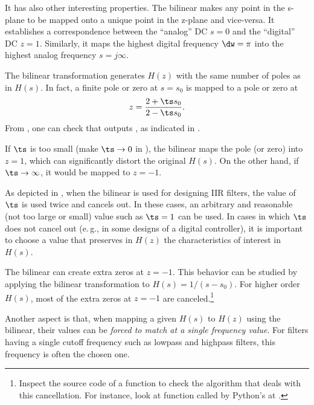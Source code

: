 It has also other interesting properties.
The bilinear makes any point in the s-plane to be mapped onto a unique point in the z-plane and vice-versa. It establishes a correspondence between the ``analog'' DC $s=0$ and the ``digital'' DC $z=1$. Similarly, it maps the highest digital frequency $\dw=\pi$ into the highest analog frequency $s=j\infty$.

The bilinear transformation generates $H(z)$ with the same number of poles as in $H(s)$. 
In fact, a finite pole or zero at $s=s_0$ is mapped to a pole or zero at 
\begin{equation}
z= \frac{2+\ts s_0}{2- \ts s_0}.
\label{eq:bilinearPoleZeroMap}
\end{equation}
From , one can check that 
 outputs , as indicated in . 

If $\ts$ is too small (make $\ts \rightarrow 0$ in ), the bilinear maps the pole (or zero) into $z=1$, which
can significantly distort the original $H(s)$. On the other hand, if $\ts \rightarrow \infty$, it
would be mapped to $z=-1$.

As depicted in , when the bilinear is used for designing IIR filters, the value of $\ts$ is used twice and cancels out. In these cases, an arbitrary and reasonable (not too large or small) value such as $\ts=1$ can be used. In cases in which $\ts$ does not cancel out (e.\,g., in some designs of a digital controller), it is important to choose a value that preserves in $H(z)$ the characteristics of interest in $H(s)$.

The bilinear can create extra zeros at $z=-1$. This behavior can be studied by applying the bilinear transformation to $H(s)=1/(s-s_0)$. For higher order $H(s)$, most of the extra zeros at $z=-1$ are canceled.\footnote{Inspect the source code of a  function to check the algorithm that deals with this cancellation. For instance, 
look at function  called by Python's  at .
}

Another aspect is that, when mapping a given $H(s)$ to $H(z)$ using the bilinear, their values can be \emph{forced to match at a single frequency value}. For filters having a single cutoff frequency such as lowpass and highpass filters, this frequency is often the chosen one.

